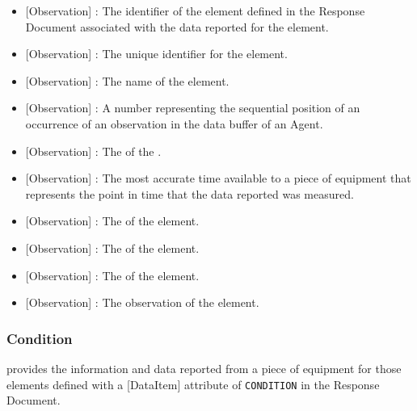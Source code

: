 \begin{itemize}

\item {}[Observation] : The identifier of the  element defined in the  \gls{Response Document} associated with the data reported for the  element.

\item {}[Observation] : The unique identifier for the  element.

\item {}[Observation] : The name of the  element.

\item {}[Observation] : A number representing the sequential position of an occurrence of an \gls{observation} in the data buffer of an \gls{Agent}.

\item {}[Observation] : The  of the .

\item {}[Observation] : The most accurate time available to a piece of equipment that represents the point in time that the data reported was measured.

\item {}[Observation] : The  of the  element.

\item {}[Observation] : The  of the  element.

\item {}[Observation] : The  of the  element.

\item {}[Observation] : The \gls{observation} of the  element.
\end{itemize}

\subsubsection{Condition}




 provides the information and data reported from a piece of equipment for those  elements defined with a [DataItem] attribute of \texttt{CONDITION} in the  \gls{Response Document}.


